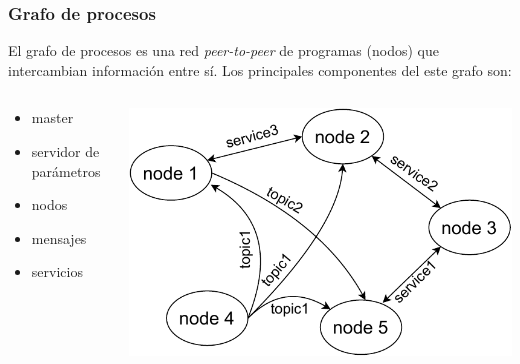 \documentclass[10pt,spanish,aspectratio=1610]{beamer}
\begin{document}
\begin{frame}\frametitle{Grafo de procesos}
  El grafo de procesos es una red \textit{peer-to-peer} de programas (nodos) que intercambian información entre sí. Los principales componentes del este grafo son:
  \[\]
  \begin{columns}
    \begin{column}{0.5\textwidth}
      \begin{itemize}
      \item master
      \item servidor de parámetros
      \item nodos
      \item mensajes
      \item servicios 
      \end{itemize}
    \end{column}
    \begin{column}{0.5\textwidth}
      \includegraphics[width=\textwidth]{Figures/RosGraph.pdf}
    \end{column}
  \end{columns}
\end{frame}
\end{document}
